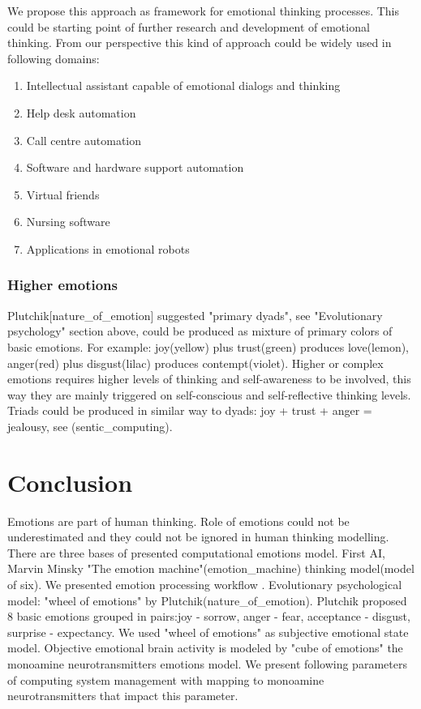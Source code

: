 We propose this approach as framework for emotional thinking processes. This could be starting point of further research and development of emotional thinking. From our perspective this kind of approach could be widely used in following domains:

\begin{enumerate}
\item  Intellectual assistant capable of emotional dialogs and thinking
\item  Help desk automation
\item  Call centre automation
\item  Software and hardware support automation
\item  Virtual friends
\item  Nursing software
\item  Applications in emotional robots
\end{enumerate}

\subsubsection{Higher emotions}

Plutchik[nature_of_emotion] suggested "primary dyads", see "Evolutionary psychology" section above, could be produced as mixture of primary colors of basic emotions. For example: joy(yellow) plus trust(green) produces love(lemon), anger(red) plus disgust(lilac) produces contempt(violet). Higher or complex emotions requires higher levels of thinking and self-awareness to be involved, this way they are mainly triggered on self-conscious and self-reflective thinking levels. Triads could be produced in similar way to dyads: joy + trust + anger = jealousy, see (sentic_computing).

\section{Conclusion}

Emotions are part of human thinking. Role of emotions could not be underestimated and they could not be ignored in human thinking modelling.
There are three bases of presented computational emotions model. First AI, Marvin Minsky "The emotion machine"(emotion_machine) thinking model(model of six). We presented emotion processing workflow . Evolutionary psychological model: "wheel of emotions" by Plutchik(nature_of_emotion). Plutchik proposed 8 basic emotions grouped in pairs:joy - sorrow, anger - fear, acceptance - disgust, surprise - expectancy. We used "wheel of emotions" as subjective emotional state model. Objective emotional brain activity is modeled by "cube of emotions" the monoamine neurotransmitters emotions model. We present following parameters of computing system management with mapping to monoamine neurotransmitters
that impact this parameter.

